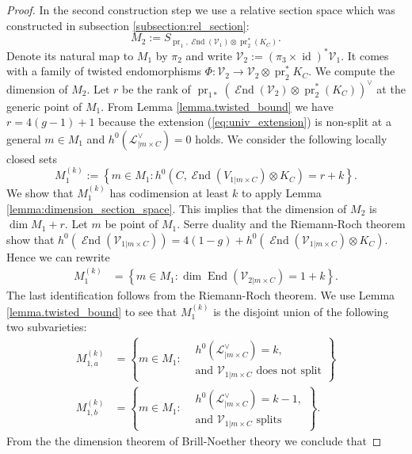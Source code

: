 \documentclass[12pt]{extarticle}
\theoremstyle{definition}
\numberwithin{theorem}{section}
\newcommand{\cL}{\mathcal{L}}
\newcommand{\cV}{\mathcal{V}}
\newcommand{\op}{\operatorname}
\DeclareMathOperator{\End}{\mathcal{E}nd}
\begin{document}
\begin{proof}
In the second construction step we use a relative section space which was constructed in subsection \ref{subsection:rel_section}:
\begin{equation*}
M_2 := S_{\op{pr}_1,\End(\cV_1)\otimes \op{pr}_2^*(K_C)}. 
\end{equation*} 
Denote its natural map to $M_1$ by $\pi_2$ and write $\cV_2 := (\pi_3\times \op{id})^*\cV_1$. It comes with a family of twisted endomorphisms $\Phi: \cV_2 \to \cV_2 \otimes \op{pr}_2^*K_C$. 
We compute the dimension of $M_2$. Let $r$ be the rank of $\op{pr}_{1*}\left( \End(\cV_2)\otimes \op{pr}_2^*(K_C)\right)^\vee$ at the generic point of $M_1$. From Lemma \ref{lemma.twisted_bound} we have  $r = 4(g-1)+1$ because the extension (\ref{eq:univ_extension}) is non-split at a general $m\in M_1$ and $h^0(\cL^\vee_{|m\times C}) = 0$ holds. We consider the following locally closed sets
\begin{equation}\label{eq:jump_loci}
M_1^{(k)} := \left\{ m \in M_1 :  h^0(C,\End\left(V_{1|m\times C}\right)\otimes K_C) = r+k\right\}. 
\end{equation} 
We show that $M_1^{(k)}$ has codimension at least $k$ to apply Lemma \ref{lemma:dimension_section_space}. This implies that the dimension of $M_2$ is $\dim M_1 + r$. Let $m$ be point of $M_1$.
Serre duality and the Riemann-Roch theorem show that $h^0(\End(\cV_{1|m\times C})) = 4(1-g) + h^0(\End(\cV_{1|m\times C}) \otimes K_C)$.
Hence we can rewrite 
\begin{align*}
M_1^{(k)} &= \left\{ m \in M_1: \dim \op{End}(\cV_{2|m\times C}) = 1+ k\right\}.
\end{align*}
The last identification follows from the Riemann-Roch theorem.
We use Lemma \ref{lemma.twisted_bound} 
to see that $M_1^{(k)}$ is the disjoint union of the following two subvarieties:
\begin{align*}
M_{1,a}^{(k)} &= \left\{m \in M_1: \begin{aligned}
&h^0(\cL_{|m\times C}^\vee) = k,\\ 
&\text{and $\cV_{1|m\times C}$ does not split}
\end{aligned} \right\} \\
M_{1,b}^{(k)} &= \left\{m \in M_1: 
\begin{aligned}
&h^0(\cL_{|m\times C}^\vee) =  k-1,\\ 
&\text{and $\cV_{1|m\times C}$ splits}
\end{aligned}
\right\}.
\end{align*} 
From the the dimension theorem of Brill-Noether theory we conclude that 

\end{proof}
\end{document}
